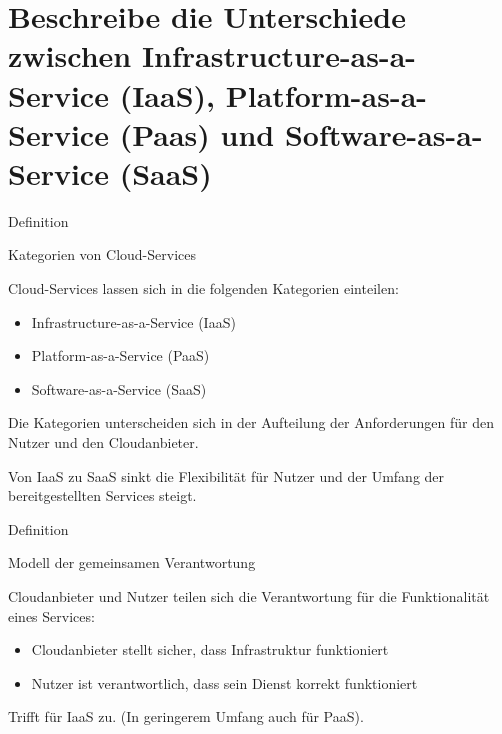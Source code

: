\documentclass{scrartcl}
\newenvironment{flashcard}[2][]{%
    #1
    \vfill
    \centerline{\Large{#2}}
    \vfill
\newpage
}
{\newpage}
\newcommand{\sectioncard}[1]{
    \vspace*{\stretch{1}}
    \section{#1}
    \vspace*{\stretch{1}}
    \pagebreak
}
\begin{document}
    \sectioncard{Beschreibe die Unterschiede zwischen Infrastructure-as-a-Service (IaaS), Platform-as-a-Service (Paas) und Software-as-a-Service (SaaS)}

    \begin{flashcard}[Definition]{Kategorien von Cloud-Services}
        Cloud-Services lassen sich in die folgenden Kategorien einteilen:
        \begin{itemize}
            \item Infrastructure-as-a-Service (IaaS)
            \item Platform-as-a-Service (PaaS)
            \item Software-as-a-Service (SaaS)
        \end{itemize}
        Die Kategorien unterscheiden sich in der Aufteilung der Anforderungen für den Nutzer und den Cloudanbieter.

        Von IaaS zu SaaS sinkt die Flexibilität für Nutzer und der Umfang der bereitgestellten Services steigt.

    \end{flashcard}

    \begin{flashcard}[Definition]{Modell der gemeinsamen Verantwortung}
        Cloudanbieter und Nutzer teilen sich die Verantwortung für die Funktionalität eines Services:
        \begin{itemize}
            \item Cloudanbieter stellt sicher, dass Infrastruktur funktioniert
            \item Nutzer ist verantwortlich, dass sein Dienst korrekt funktioniert
        \end{itemize}
        Trifft für IaaS zu. (In geringerem Umfang auch für PaaS).
    \end{flashcard}
\end{document}
